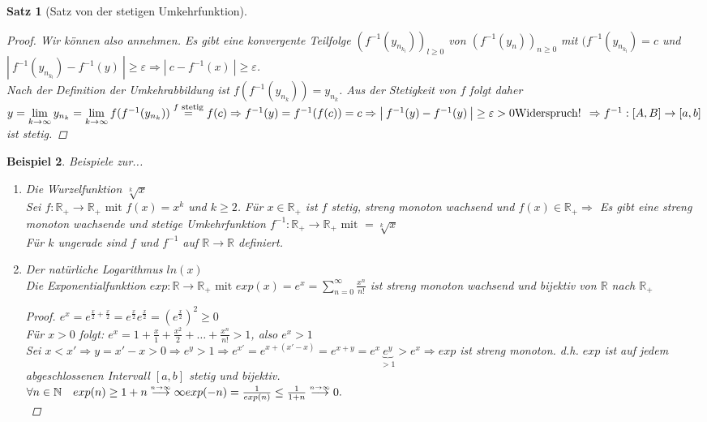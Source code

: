 \documentclass[a4paper,titlepage,oneside]{article}
\def\N{\ensuremath{\mathbb{N}} }
\def\R{\ensuremath{\mathbb{R}} }
\renewcommand{\epsilon}{\ensuremath{\varepsilon} }
\def\WSP{\text{Widerspruch! }}
\newcommand{\suminf}[2][n]{\ensuremath{\sum_{#1= 0}^{\infty}{#2}}}
\renewcommand{\liminf}[2][n]{\ensuremath{\lim\limits_{#1 \rightarrow \infty}{#2}}}
\newcommand{\abs}[1]{\ensuremath{\left|\:#1\:\right|}}
\newcommand{\longtoinf}[1][n]{\ensuremath{\overset{\scriptscriptstyle{#1 \to \infty}}{\longrightarrow}}}
\theoremstyle{thmstyle}
\newtheorem{satz}{Satz}[section]
\newtheorem{bsp}[satz]{Beispiel}
\theoremstyle{subthmstyle}
\begin{document}
\begin{satz}[Satz von der stetigen Umkehrfunktion]
\begin{proof}
Wir können also annehmen. Es gibt eine konvergente Teilfolge $(f^{-1}(y_{n_{k_l}}))_{l \ge 0}$ von $(f^{-1}(y_n))_{n \ge 0}$ mit $(f^{-1}(y_{n_{k_l}}) = c$  und $\abs{f^{-1}(y_{n_{k_l}}) - f^{-1}(y)} \ge \epsilon \Rightarrow \abs{c - f^{-1}(x)} \ge \epsilon$. \\
 Nach der Definition der Umkehrabbildung ist $f(f^{-1}(y_{n_k})) = y_{n_k}$. Aus der Stetigkeit von $f$ folgt daher $y = \liminf[k]{y_{n_k}} = \liminf[k]{f(f^{-1}(y_{n_k}))}  \overset{f \text{ stetig}}{=} f(c)\\
 \Rightarrow f^{-1}(y) = f^{-1}(f(c)) = c
\Rightarrow \abs{f^{-1}(y) - f^{-1}(y)} \ge \epsilon > 0 \WSP \Rightarrow f^{-1}:[A,B] \to [a,b] $ ist stetig.
\end{proof}
\end{satz}

\begin{bsp}
Beispiele zur...
\begin{enumerate}
\item Die Wurzelfunktion $\sqrt[k]{x}$\\
Sei $f: \R_+ \to \R_+ \text{ mit } f(x) = x^k $ und $ k \ge 2$.
Für $x \in \R_+$ ist $f$ stetig, streng monoton wachsend und $f(x) \in \R_+ \Rightarrow $ Es gibt eine streng monoton wachsende und stetige Umkehrfunktion $f^{-1}: \R_+ \to \R_+ \text{ mit } = \sqrt[k]{x}$\\
Für $k$ ungerade sind $f$ und $f^{-1}$ auf $\R \to \R$ definiert.
\item Der natürliche Logarithmus $ln(x)$\\
Die Exponentialfunktion $exp: \R \to \R_+ \text{ mit } exp(x) = e^x = \suminf{\frac{x^n}{n!}}$ ist streng monoton wachsend und bijektiv von \R nach $\R_+$
\begin{proof}
	$e^x = e^{\frac{x}{2} + \frac{x}{2}} = e^{\frac{x}{2}} e^{\frac{x}{2}} = (e^{\frac{x}{2}})^2 \ge 0$\\
	Für $x > 0$ folgt: $e^x = 1 + \frac{x}{1} + \frac{x^2}{2} + \dots + \frac{x^n}{n!} > 1$, also $e^x > 1$\\
	Sei $x < x' \Rightarrow y = x' - x > 0 \Rightarrow e^y > 1 \Rightarrow e^{x'} = e^{x+(x'-x)} = e^{x+y} = e^x \underbrace{e^y}_{> 1} > e^x \Rightarrow exp$ ist streng monoton.
	d.h. $exp$ ist auf jedem abgeschlossenen Intervall $[a,b]$ stetig und bijektiv.\\
	$\forall n\in\N \quad 	exp(n)\ge 1 + n \longtoinf \infty \\
					exp(-n) = \frac{1}{exp(n)} \le \frac{1}{1+n} \longtoinf 0.$\\

\end{proof}
\end{enumerate}
\end{bsp}
\end{document}
